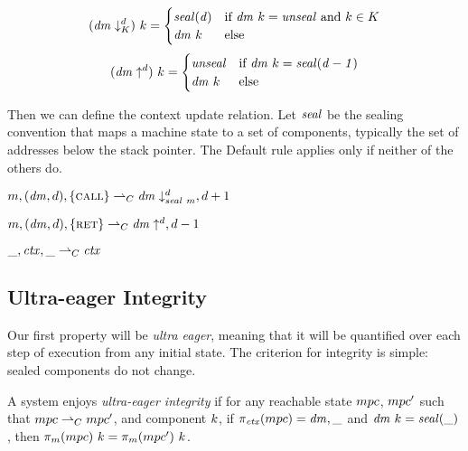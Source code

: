 \documentclass[acmsmall,review,anonymous]{acmart}\settopmatter{printfolios=true,printccs=false,printacmref=false}
\begin{document}
\[
(\mathit{dm} \downarrow^{d}_{K}) ~ k =
\begin{cases}
  \mathit{seal(d)} & \text{if } \mathit{dm} ~ k = \mathit{unseal}
                    \text{ and } k \in K \\
  \mathit{dm} ~ k & \text{else} \\
\end{cases}
\]
\[
(\mathit{dm} \uparrow^{d}) ~ k =
\begin{cases}
  \mathit{unseal} & \text{if } \mathit{dm} ~ k = \mathit{seal(d-1)} \\
  \mathit{dm} ~ k & \text{else} \\
\end{cases}
\]

Then we can define the context update relation. Let \(\mathit{seal}\) be the sealing convention
that maps a machine state to a set of components, typically the set of addresses below
the stack pointer. The {\sc Default} rule applies only if neither of the others do.

\begin{center}
\begin{minipage}{.4\textwidth}
  \judgment{}
           {\(m,(\mathit{dm},d),\{\text{\sc call}\} \overset{}{\rightharpoonup}_C
             \mathit{dm} \downarrow^{d}_{\mathit{seal} ~ m},d+1\)}
\end{minipage}
\hspace*{0.1\textwidth}
\begin{minipage}{.4\textwidth}
  \judgment{}
           {\(m,(\mathit{dm},d),\{\text{\sc ret}\} \overset{}{\rightharpoonup}_C
             \mathit{dm} \uparrow^{d},d-1\)}
\end{minipage}
\end{center}

\begin{center}
  \judgment[Default]
           {}
           {\(\_,\mathit{ctx},\_ \overset{}{\rightharpoonup}_C \mathit{ctx}\)}
\end{center}

\subsection{Ultra-eager Integrity}

Our first property will be {\em ultra eager}, meaning that it will be quantified over each step
of execution from any initial state. The criterion for integrity is simple: sealed components do not
change.

 A system enjoys {\em ultra-eager integrity} if for any reachable state
\(mpc\), \(mpc'\) such that \(mpc \overset{}{\rightharpoonup}_C mpc'\),
and component \(k\), if \(\pi_{\mathit{ctx}}(mpc) = \mathit{dm},\_\) and
\(\mathit{dm} ~ k = \mathit{seal(\_)}\), then \(\pi_m(mpc) ~ k =
\pi_m(mpc') ~ k\).
\end{document}
